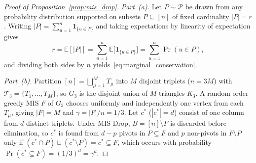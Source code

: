 \documentclass[12pt]{article}
\theoremstyle{definition}
\newcommand{\E}{\mathbb{E}}
\newcommand{\Tc}{\mathcal{T}_3}
\begin{document}
\begin{proof}[Proof of Proposition~\ref{prop:mis_drop}]
\emph{Part~(a).} Let $P \sim \mathcal{P}$ be drawn from any probability distribution supported on subsets $P
\subseteq [n]$ of fixed cardinality $|P| = r$. Writing $|P| = \sum_{u=1}^n \mathbf{1}_{\{u \in P\}}$ and taking
expectations by linearity of expectation gives
\[
  r = \E[|P|] = \sum_{u=1}^n \E\bigl[\mathbf{1}_{\{u \in P\}}\bigr] = \sum_{u=1}^n \Pr(u \in P),
\]
and dividing both sides by $n$ yields~\eqref{eq:marginal_conservation}.

\emph{Part~(b).} Partition $[n] = \bigsqcup_{\mu=1}^M T_\mu$ into $M$ disjoint triplets ($n = 3M$) with $\Tc =
\{T_1, \dots, T_M\}$, so $G_3$ is the disjoint union of $M$ triangles $K_3$. A random-order greedy MIS $F$ of $G_3$
chooses uniformly and independently one vertex from each $T_\mu$, giving $|F| = M$ and $\gamma = |F|/n = 1/3$. Let
$c^*$ ($|c^*| = d$) consist of one column from $d$ distinct triplets. Under MIS Drop, $B = [n] \setminus F$ is
discarded before elimination, so $c^*$ is found from $d - p$ pivots in $P \subseteq F$ and $p$ non-pivots in $F
\setminus P$ only if $(c^* \cap P) \sqcup (c^* \setminus P) = c^* \subseteq F$, which occurs with probability
$\Pr(c^* \subseteq F) = (1/3)^d = \gamma^d$.


\end{proof}
\end{document}
